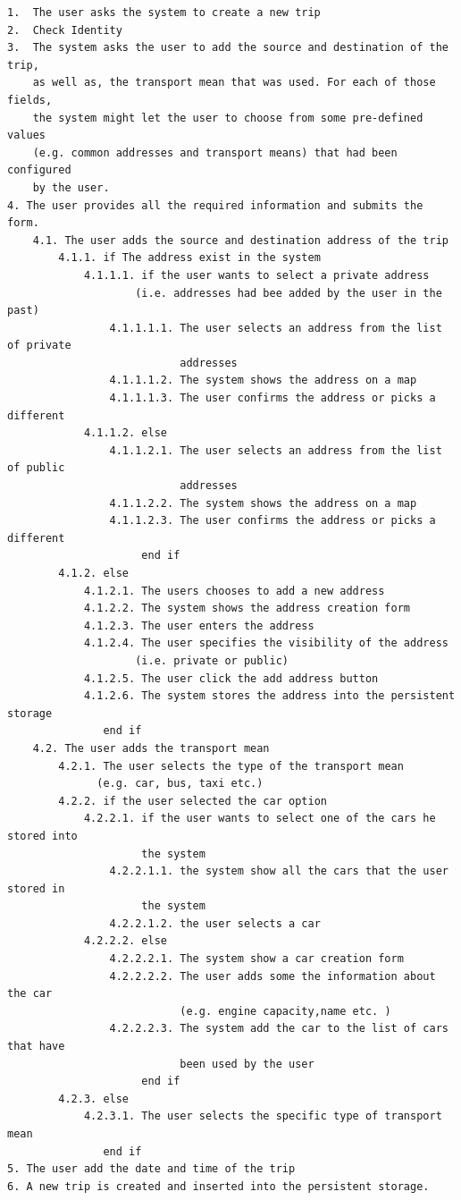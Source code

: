 \begin{verbatim}
1.  The user asks the system to create a new trip
2.  Check Identity
3.  The system asks the user to add the source and destination of the trip,
    as well as, the transport mean that was used. For each of those fields,
    the system might let the user to choose from some pre-defined values
    (e.g. common addresses and transport means) that had been configured
    by the user.
4. The user provides all the required information and submits the form.
    4.1. The user adds the source and destination address of the trip
        4.1.1. if The address exist in the system
            4.1.1.1. if the user wants to select a private address
                    (i.e. addresses had bee added by the user in the past)
                4.1.1.1.1. The user selects an address from the list of private
                           addresses
                4.1.1.1.2. The system shows the address on a map
                4.1.1.1.3. The user confirms the address or picks a different
            4.1.1.2. else
                4.1.1.2.1. The user selects an address from the list of public
                           addresses
                4.1.1.2.2. The system shows the address on a map
                4.1.1.2.3. The user confirms the address or picks a different
                     end if
        4.1.2. else
            4.1.2.1. The users chooses to add a new address
            4.1.2.2. The system shows the address creation form
            4.1.2.3. The user enters the address
            4.1.2.4. The user specifies the visibility of the address
                    (i.e. private or public)
            4.1.2.5. The user click the add address button
            4.1.2.6. The system stores the address into the persistent storage
               end if
    4.2. The user adds the transport mean
        4.2.1. The user selects the type of the transport mean
              (e.g. car, bus, taxi etc.)
        4.2.2. if the user selected the car option
            4.2.2.1. if the user wants to select one of the cars he stored into
                     the system
                4.2.2.1.1. the system show all the cars that the user stored in
                     the system
                4.2.2.1.2. the user selects a car
            4.2.2.2. else
                4.2.2.2.1. The system show a car creation form
                4.2.2.2.2. The user adds some the information about the car
                           (e.g. engine capacity,name etc. )
                4.2.2.2.3. The system add the car to the list of cars that have
                           been used by the user
                     end if
        4.2.3. else
            4.2.3.1. The user selects the specific type of transport mean
               end if
5. The user add the date and time of the trip
6. A new trip is created and inserted into the persistent storage.
\end{verbatim}


